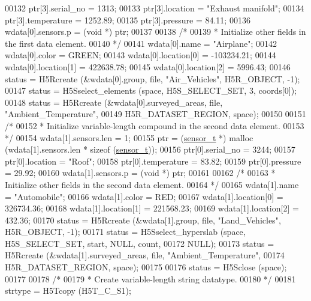 \begin{DoxyCode}
00132     ptr[3].serial\_no = 1313;
00133     ptr[3].location = \textcolor{stringliteral}{"Exhaust manifold"};
00134     ptr[3].temperature = 1252.89;
00135     ptr[3].pressure = 84.11;
00136     wdata[0].sensors.p = (\textcolor{keywordtype}{void} *) ptr;
00137 
00138     \textcolor{comment}{/*}
00139 \textcolor{comment}{     * Initialize other fields in the first data element.}
00140 \textcolor{comment}{     */}
00141     wdata[0].name = \textcolor{stringliteral}{"Airplane"};
00142     wdata[0].color = GREEN;
00143     wdata[0].location[0] = -103234.21;
00144     wdata[0].location[1] = 422638.78;
00145     wdata[0].location[2] = 5996.43;
00146     status = H5Rcreate (&wdata[0].group, file, \textcolor{stringliteral}{"Air\_Vehicles"}, H5R\_OBJECT, -1);
00147     status = H5Sselect\_elements (space, H5S\_SELECT\_SET, 3, coords[0]);
00148     status = H5Rcreate (&wdata[0].surveyed\_areas, file, \textcolor{stringliteral}{"Ambient\_Temperature"},
00149                 H5R\_DATASET\_REGION, space);
00150 
00151     \textcolor{comment}{/*}
00152 \textcolor{comment}{     * Initialize variable-length compound in the second data element.}
00153 \textcolor{comment}{     */}
00154     wdata[1].sensors.len = 1;
00155     ptr = (\hyperlink{structsensor__t}{sensor\_t} *) malloc (wdata[1].sensors.len * sizeof (\hyperlink{structsensor__t}{sensor\_t}));
00156     ptr[0].serial\_no = 3244;
00157     ptr[0].location = \textcolor{stringliteral}{"Roof"};
00158     ptr[0].temperature = 83.82;
00159     ptr[0].pressure = 29.92;
00160     wdata[1].sensors.p = (\textcolor{keywordtype}{void} *) ptr;
00161 
00162     \textcolor{comment}{/*}
00163 \textcolor{comment}{     * Initialize other fields in the second data element.}
00164 \textcolor{comment}{     */}
00165     wdata[1].name = \textcolor{stringliteral}{"Automobile"};
00166     wdata[1].color = RED;
00167     wdata[1].location[0] = 326734.36;
00168     wdata[1].location[1] = 221568.23;
00169     wdata[1].location[2] = 432.36;
00170     status = H5Rcreate (&wdata[1].group, file, \textcolor{stringliteral}{"Land\_Vehicles"}, H5R\_OBJECT, -1);
00171     status = H5Sselect\_hyperslab (space, H5S\_SELECT\_SET, start, NULL, count,
00172                 NULL);
00173     status = H5Rcreate (&wdata[1].surveyed\_areas, file, \textcolor{stringliteral}{"Ambient\_Temperature"},
00174                 H5R\_DATASET\_REGION, space);
00175 
00176     status = H5Sclose (space);
00177 
00178     \textcolor{comment}{/*}
00179 \textcolor{comment}{     * Create variable-length string datatype.}
00180 \textcolor{comment}{     */}
00181     strtype = H5Tcopy (H5T\_C\_S1);

\end{DoxyCode}
